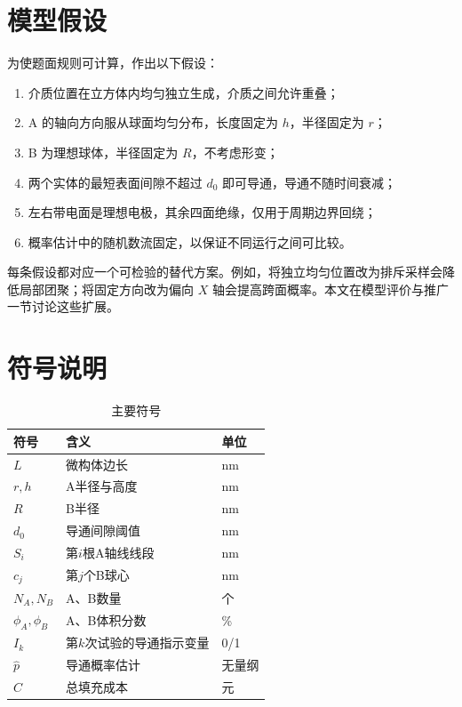 \documentclass[12pt,a4paper,fontset=windows]{ctexart}
\begin{document}
\section{模型假设}

为使题面规则可计算，作出以下假设：
\begin{enumerate}[label=(\arabic*)]
\item 介质位置在立方体内均匀独立生成，介质之间允许重叠；
\item A 的轴向方向服从球面均匀分布，长度固定为 $h$，半径固定为 $r$；
\item B 为理想球体，半径固定为 $R$，不考虑形变；
\item 两个实体的最短表面间隙不超过 $d_0$ 即可导通，导通不随时间衰减；
\item 左右带电面是理想电极，其余四面绝缘，仅用于周期边界回绕；
\item 概率估计中的随机数流固定，以保证不同运行之间可比较。
\end{enumerate}
每条假设都对应一个可检验的替代方案。例如，将独立均匀位置改为排斥采样会降低局部团聚；将固定方向改为偏向 $X$ 轴会提高跨面概率。本文在模型评价与推广一节讨论这些扩展。

\section{符号说明}

\begin{longtable}{p{2.2cm}p{7cm}p{3cm}}\caption{主要符号}\\\toprule 符号&含义&单位\\\midrule\endhead $L$&微构体边长&nm\\ $r,h$&A半径与高度&nm\\ $R$&B半径&nm\\ $d_0$&导通间隙阈值&nm\\ $S_i$&第$i$根A轴线线段&nm\\ $c_j$&第$j$个B球心&nm\\ $N_A,N_B$&A、B数量&个\\ $\phi_A,\phi_B$&A、B体积分数&\%\\ $I_k$&第$k$次试验的导通指示变量&0/1\\ $\hat p$&导通概率估计&无量纲\\ $C$&总填充成本&元\\\bottomrule\end{longtable}
\end{document}
